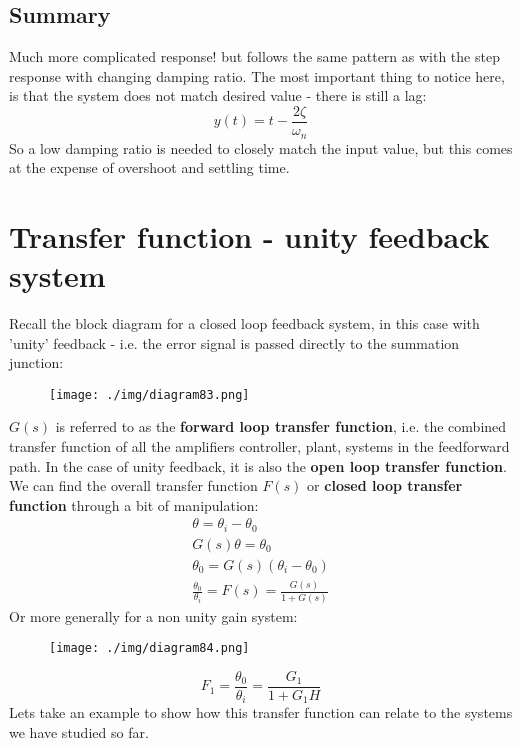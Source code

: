 \subsection{Summary}
Much more complicated response! but follows the same pattern as with the step response with changing damping ratio. The most important thing to notice here, is that the system does not match desired value - there is still a lag:
\begin{equation}
  y(t) = t - \frac{2\zeta}{\omega_n}
\end{equation}
So a low damping ratio is needed to closely match the input value, but this comes at the expense of overshoot and settling time.
\section{Transfer function - unity feedback system}
Recall the block diagram for a closed loop feedback system, in this case with 'unity' feedback - i.e. the error signal is passed directly to the summation junction:
\begin{figure}[H]
  \centering
  \texttt{[image: ./img/diagram83.png]}
\end{figure}
$G(s)$ is referred to as the \textbf{forward loop transfer function}, i.e. the combined transfer function of all the amplifiers controller, plant, systems in the feedforward path. In the case of unity feedback, it is also the \textbf{open loop transfer function}. We can find the overall transfer function $F(s)$ or \textbf{closed loop transfer function} through a bit of manipulation:
\begin{gather}
  \theta = \theta_i - \theta_0\\
  G(s)\theta = \theta_0\\
  \theta_0 = G(s) (\theta_i - \theta_0)\\
  \frac{\theta_0}{\theta_i} = F(s) = \frac{G(s)}{1 + G(s)}
\end{gather}
Or more generally for a non unity gain system:
\begin{figure}[H]
  \centering
  \texttt{[image: ./img/diagram84.png]}
\end{figure}
\begin{equation}
  F_1 = \frac{\theta_0}{\theta_i} = \frac{G_1}{1 + G_1 H}
\end{equation}
Lets take an example to show how this transfer function can relate to the systems we have studied so far.
